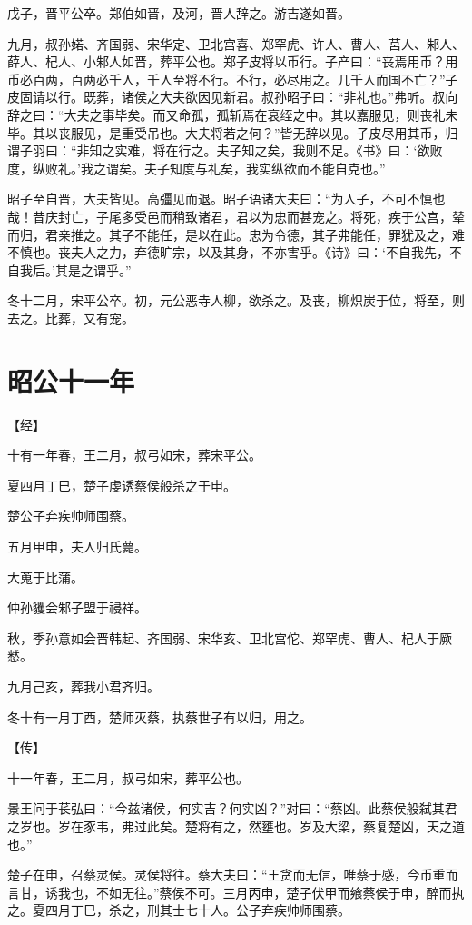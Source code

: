 \documentclass[a4paper,12pt,UTF8,twoside]{ctexbook}
\begin{document}
戊子，晋平公卒。郑伯如晋，及河，晋人辞之。游吉遂如晋。

九月，叔孙婼、齐国弱、宋华定、卫北宫喜、郑罕虎、许人、曹人、莒人、邾人、薛人、杞人、小邾人如晋，葬平公也。郑子皮将以币行。子产曰：“丧焉用币？用币必百两，百两必千人，千人至将不行。不行，必尽用之。几千人而国不亡？”子皮固请以行。既葬，诸侯之大夫欲因见新君。叔孙昭子曰：“非礼也。”弗听。叔向辞之曰：“大夫之事毕矣。而又命孤，孤斩焉在衰绖之中。其以嘉服见，则丧礼未毕。其以丧服见，是重受吊也。大夫将若之何？”皆无辞以见。子皮尽用其币，归谓子羽曰：“非知之实难，将在行之。夫子知之矣，我则不足。《书》曰：‘欲败度，纵败礼。’我之谓矣。夫子知度与礼矣，我实纵欲而不能自克也。”

昭子至自晋，大夫皆见。高彊见而退。昭子语诸大夫曰：“为人子，不可不慎也哉！昔庆封亡，子尾多受邑而稍致诸君，君以为忠而甚宠之。将死，疾于公宫，辇而归，君亲推之。其子不能任，是以在此。忠为令德，其子弗能任，罪犹及之，难不慎也。丧夫人之力，弃德旷宗，以及其身，不亦害乎。《诗》曰：‘不自我先，不自我后。’其是之谓乎。”

冬十二月，宋平公卒。初，元公恶寺人柳，欲杀之。及丧，柳炽炭于位，将至，则去之。比葬，又有宠。

\chapter{昭公十一年}



【经】

十有一年春，王二月，叔弓如宋，葬宋平公。

夏四月丁巳，楚子虔诱蔡侯般杀之于申。

楚公子弃疾帅师围蔡。

五月甲申，夫人归氏薨。

大蒐于比蒲。

仲孙貜会邾子盟于祲祥。

秋，季孙意如会晋韩起、齐国弱、宋华亥、卫北宫佗、郑罕虎、曹人、杞人于厥慭。

九月己亥，葬我小君齐归。

冬十有一月丁酉，楚师灭蔡，执蔡世子有以归，用之。

【传】

十一年春，王二月，叔弓如宋，葬平公也。

景王问于苌弘曰：“今兹诸侯，何实吉？何实凶？”对曰：“蔡凶。此蔡侯般弑其君之岁也。岁在豕韦，弗过此矣。楚将有之，然壅也。岁及大梁，蔡复楚凶，天之道也。”

楚子在申，召蔡灵侯。灵侯将往。蔡大夫曰：“王贪而无信，唯蔡于感，今币重而言甘，诱我也，不如无往。”蔡侯不可。三月丙申，楚子伏甲而飨蔡侯于申，醉而执之。夏四月丁巳，杀之，刑其士七十人。公子弃疾帅师围蔡。
\end{document}

